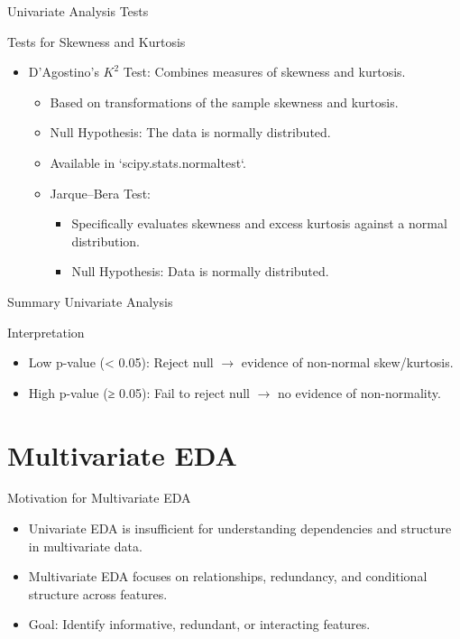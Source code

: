 \documentclass[aspectratio=169]{beamer}
\begin{document}
\begin{frame}[label={sec:orgd86562f}]{Univariate Analysis Tests}
\begin{block}{Tests for Skewness and Kurtosis}
\begin{itemize}
\item \alert{D'Agostino's \(K^2\) Test}: Combines measures of skewness and kurtosis.
\begin{itemize}
\item Based on transformations of the sample skewness and kurtosis.
\item Null Hypothesis: The data is normally distributed.
\item Available in `scipy.stats.normaltest`.
\end{itemize}
\begin{itemize}
\item \alert{\alert{Jarque–Bera Test}}:
\begin{itemize}
\item Specifically evaluates skewness and excess kurtosis against a normal distribution.
\item Null Hypothesis: Data is normally distributed.
\end{itemize}
\end{itemize}
\end{itemize}
\end{block}
\end{frame}

\begin{frame}[label={sec:org9b4c846}]{Summary Univariate Analysis}
\begin{block}{Interpretation}
\begin{itemize}
\item \alert{Low p-value (< 0.05)}: Reject null \(\rightarrow\) evidence of
non-normal skew/kurtosis.
\item \alert{High p-value (≥ 0.05)}: Fail to reject null \(\rightarrow\) no
evidence of non-normality.
\end{itemize}
\end{block}
\end{frame}

\section{Multivariate EDA}
\label{sec:orgdb4f9c1}
\begin{frame}[label={sec:org379917c}]{Motivation for Multivariate EDA}
\begin{itemize}
\item Univariate EDA is insufficient for understanding dependencies and
structure in multivariate data.
\item Multivariate EDA focuses on relationships, redundancy, and
conditional structure across features.
\item Goal: Identify informative, redundant, or interacting features.
\end{itemize}
\end{frame}
\end{document}

